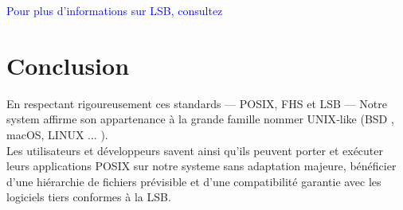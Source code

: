 \textcolor{blue}{Pour plus d’informations sur LSB, consultez \cite{LSB}}
\section{Conclusion}

\bigskip
\noindent
En respectant rigoureusement ces standards — POSIX, FHS et LSB — Notre system  affirme son appartenance à la grande famille 
nommer UNIX‑like (BSD , macOS, LINUX ... ).\\
Les utilisateurs et développeurs savent ainsi qu’ils peuvent porter et exécuter leurs applications POSIX sur notre systeme  sans adaptation majeure, bénéficier d’une hiérarchie de fichiers prévisible et d’une compatibilité garantie avec les logiciels tiers conformes à la LSB.




